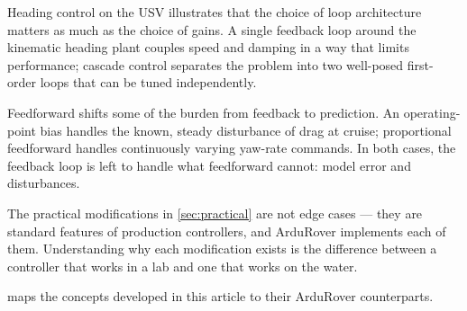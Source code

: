 \documentclass[12pt]{article}
\begin{document}
Heading control on the USV illustrates that the choice of loop architecture
matters as much as the choice of gains.  A single feedback loop around the
kinematic heading plant couples speed and damping in a way that limits
performance; cascade control separates the problem into two well-posed
first-order loops that can be tuned independently.

Feedforward shifts some of the burden from feedback to prediction.  An
operating-point bias handles the known, steady disturbance of drag at cruise;
proportional feedforward handles continuously varying yaw-rate commands.  In
both cases, the feedback loop is left to handle what feedforward cannot: model
error and disturbances.

The practical modifications in \cref{sec:practical} are not edge cases --- they
are standard features of production controllers, and ArduRover implements each
of them.  Understanding why each modification exists is the difference between
a controller that works in a lab and one that works on the water.

 maps the concepts developed in this article to their
ArduRover counterparts.
\end{document}
